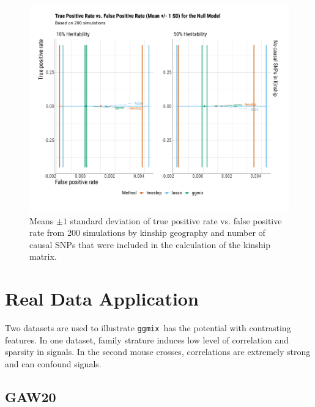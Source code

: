 \documentclass[12pt,letter]{article}\usepackage[]{graphicx}\usepackage[]{color}
\newenvironment{knitrout}{}{} %
\newcommand{\ggmix}{\texttt{ggmix}}
\begin{document}
\begin{knitrout}\scriptsize
{}\color{fgcolor}\begin{figure}[H]

{\centering \includegraphics[width=1\linewidth]{figure/plot-tpr-fpr-sim-null-model-1} 

}

\caption[Means $\pm 1$ standard deviation of true positive rate vs]{Means $\pm 1$ standard deviation of true positive rate vs. false positive rate from 200 simulations by kinship geography and number of causal SNPs that were included in the calculation of the kinship matrix.}\label{fig:plot-tpr-fpr-sim-null-model}
\end{figure}


\end{knitrout}



\section{Real Data Application}

Two datasets are used to illustrate \ggmix ~has the potential with contrasting features. In one dataset, family strature induces low level of correlation and sparsity in signals. In the second mouse crosses, correlations are extremely strong and can confound signals.

\subsection{GAW20}
\end{document}

